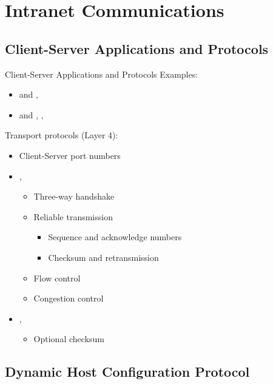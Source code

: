 \section[locl]{Intranet Communications}

\subsection{Client-Server Applications and Protocols}

\begin{frame}{Client-Server Applications and Protocols}
	Examples:\pause
	\begin{itemize}[<+->]
		\item {} and , 
		\item {} and , , 
	\end{itemize}
	Transport protocols (Layer 4):\pause
	\begin{itemize}[<+->]
		\item Client-Server port numbers
		\item {}, 
		\begin{itemize}
			\item Three-way handshake
			\item Reliable transmission
			\begin{itemize}
				\item Sequence and acknowledge numbers
				\item Checksum and retransmission
			\end{itemize}
			\item Flow control
			\item Congestion control
		\end{itemize}
		\item {}, 
		\begin{itemize}
			\item Optional checksum
		\end{itemize}
	\end{itemize}
\end{frame}

\subsection{Dynamic Host Configuration Protocol}


